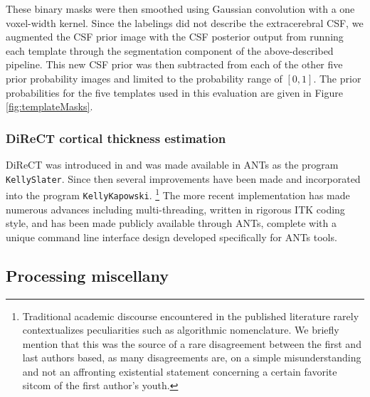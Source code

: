 These binary
masks were then smoothed using Gaussian convolution with a one voxel-width kernel.  Since the labelings did not describe the extracerebral
CSF, we augmented the CSF prior image with the CSF posterior output from running each template 
through the segmentation component of the above-described pipeline.  
This new CSF prior was then subtracted from each of the other five prior probability images
and limited to the probability range of $[0,1]$.  The prior probabilities for the 
five templates used in this evaluation are given in
Figure \ref{fig:templateMasks}.


\subsubsection{DiReCT cortical thickness estimation}

DiReCT was introduced 
in \cite{das2009} and was made available in ANTs as the program \verb#KellySlater#.
Since then several improvements have been made and incorporated into the program
\verb#KellyKapowski#.%
\footnote{
Traditional academic discourse encountered in the published literature
rarely contextualizes peculiarities such as algorithmic nomenclature.
We briefly mention that
this was the source of a rare disagreement between the first and last authors
based, as many disagreements are, on a simple misunderstanding and not an
affronting existential statement concerning a certain favorite sitcom
of the first author's youth. 
}
The more recent implementation has made numerous advances including
multi-threading, written in rigorous ITK coding style,%
 and
has been made publicly available through ANTs, complete with a unique command line
interface design developed specifically for ANTs tools.

\subsection{Processing miscellany}


